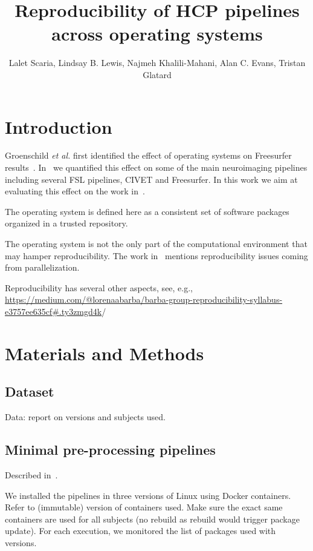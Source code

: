 \documentclass{article}
\title{Reproducibility of HCP pipelines across operating systems}
\author{Lalet Scaria, Lindsay B. Lewis, Najmeh Khalili-Mahani, Alan C. Evans, Tristan Glatard}
\begin{document}
\maketitle


\section{Introduction}

Groenschild \emph{et al.} first identified the effect of operating
systems on Freesurfer
results~\cite{Gronenschild2012}. In~\cite{10.3389/fninf.2015.00012} we
quantified this effect on some of the main neuroimaging pipelines
including several FSL pipelines, CIVET and Freesurfer. In this work we
aim at evaluating this effect on the work in~\cite{glasser2015multi}.

The operating system is defined here as a consistent set of software
packages organized in a trusted repository.

The operating system is not the only part of the computational
environment that may hamper reproducibility. The work
in~\cite{diethelm2012limits} mentions reproducibility issues coming
from parallelization.

Reproducibility has several other aspects, see, e.g.,
\url{https://medium.com/@lorenaabarba/barba-group-reproducibility-syllabus-e3757ee635cf#.ty3zmgd4k}/

\section{Materials and Methods}

\subsection{Dataset}

Data: report on versions and subjects used.

\subsection{Minimal pre-processing pipelines}

Described in~\cite{glasser2013minimal}.

We installed the pipelines in three versions of Linux using Docker
containers. Refer to (immutable) version of containers used. Make sure
the exact same containers are used for all subjects (no rebuild as
rebuild would trigger package update). For each execution, we
monitored the list of packages used with versions.
\end{document}
